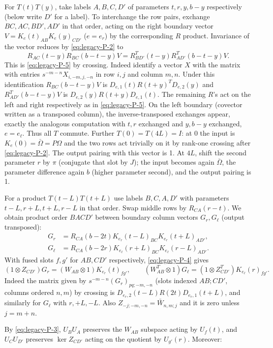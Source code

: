 For $T(t)T(y)$, take labels $A,B,C,D'$ of parameters $t,r,y,b-y$ respectively (below write $D'$ for a label). To interchange the row pairs, exchange $BC,AC,BD',AD'$ in that order, acting on the right boundary vector $V=K_e(t)_{AB}K_e(y)_{CD'}$ ($e=e_r$) by the corresponding $R$ product. Invariance of the vector reduces by \eqref{eq:legacy-P-2} to
\[
 R_{AC}(t-y)R_{BC}(b-t-y)V
 =R_{BD'}^T(t-y)R_{AD'}^T(b-t-y)V .
\]
This is \eqref{eq:legacy-P-5} by crossing. Indeed identify a vector $X$ with the matrix with entries $s^{-m-n}X_{i,-m,j,-n}$ in row $i,j$ and column $m,n$. Under this identification $R_{BC}(b-t-y)V$ is $D_{e,1}(t) R(t+y)^T D_{e,2}(y)$ and $R_{AD'}^T(b-t-y)V$ is $D_{e,2}(y) R(t+y) D_{e,1}(t)$. The remaining $R$'s act on the left and right respectively as in \eqref{eq:legacy-P-5}. On the left boundary (covector written as a transposed column), the inverse-transposed exchanges appear, exactly the analogous computation with $t,r$ exchanged and $y,b-y$ exchanged, $e=e_\ell$. Thus all $T$ commute. Further $T(0)=T(4L)=I$: at $0$ the input is $K_e(0)=\bar\Omega=P\Omega$ and the two rows act trivially on it by rank-one crossing after \eqref{eq:legacy-P-2}. The output pairing with this vector is 1. At $4L$, shift the second parameter $r$ by $\pi$ (conjugate that slot by $J$); the input becomes again $\bar\Omega$, the parameter difference again $b$ (higher parameter second), and the output pairing is 1.

For a product $T(t-L)T(t+L)$ use labels $B,C,A,D'$ with parameters $t-L,r+L,t+L,r-L$ in that order. Swap middle rows by $R_{CA}(r-t)$. We obtain product order $B A C D'$ between boundary column vectors $G_r,G_\ell$ (output transposed):
\[
 \begin{split}
 G_r &= R_{CA}(b-2t) K_{e_r}(t-L)_{BC} K_{e_r}(t+L)_{AD'},\\
 G_\ell &= R_{CA}(b-2r) K_{e_\ell}(r+L)_{BC} K_{e_\ell}(r-L)_{AD'} .
 \end{split}
\]
With fused slots $f,g'$ for $AB,C D'$ respectively, \eqref{eq:legacy-P-4} gives
\[
 (1\otimes Z_{C D'})G_r=(W_{AB}\otimes1)K_{e_r}(t)_{f g'},\qquad
 (W_{AB}^T\otimes1)G_\ell=(1\otimes Z_{C D'}^T)K_{e_\ell}(r)_{f g'} .
\]
Indeed the matrix given by $s^{-m-n} (G_r)_{p q;-m,-n}$ (slots indexed $AB;C D'$, columns ordered $n,m$) by crossing is $D_{e_r,2}(t-L) R(2t) D_{e_r,1}(t+L)$, and similarly for $G_\ell$ with $r,+L,-L$. Also $Z_{-j;-m,-n}=\bar W_{n,m;j}$ and it is zero unless $j=m+n$.

By \eqref{eq:legacy-P-3}, $U_B U_A$ preserves the $W_{AB}$ subspace acting by $U_f(t)$, and $U_C U_{D'}$ preserves $\ker Z_{C D'}$ acting on the quotient by $U_{g'}(r)$. Moreover:

